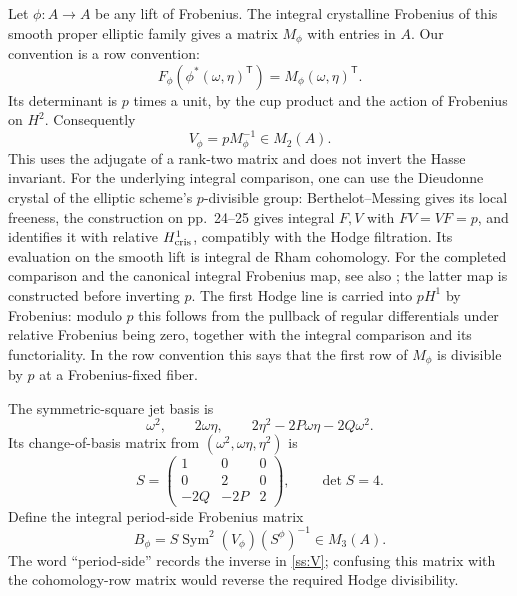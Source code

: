 \documentclass[11pt,a4paper]{article}
\begin{document}
Let $\phi:A\to A$ be any lift of Frobenius.  The integral crystalline
Frobenius of this smooth proper elliptic family gives a matrix $M_\phi$
with entries in $A$.  Our convention is a row convention:
\[
 F_\phi(\phi^*(\omega,\eta)^{\mathsf T})
       =M_\phi(\omega,\eta)^{\mathsf T}.
\]
Its determinant is $p$ times a unit, by the cup product and the action
of Frobenius on $H^2$.  Consequently
\begin{equation}\label{ss:V}
 V_\phi=pM_\phi^{-1}\in M_2(A).
\end{equation}
This uses the adjugate of a rank-two matrix and does not invert the
Hasse invariant.  For the underlying integral comparison, one can use
the Dieudonne crystal of the elliptic scheme's $p$-divisible group:
Berthelot--Messing \cite[\S2, Theorem~2, p.~23]{BM} gives its local
freeness, the construction on pp.~24--25 gives integral $F,V$ with
$FV=VF=p$, and \cite[\S3, equation~(3.1), p.~27]{BM} identifies it with
relative $H^1_{\rm cris}$, compatibly with the Hodge filtration.
Its evaluation on the smooth lift is integral de Rham cohomology.
For the completed comparison and the canonical integral Frobenius map,
see also \cite[Remark~60.24.14, Tag~07MZ; Theorem~60.26.4,
Tag~07N5]{Stacks}; the latter map is constructed before inverting $p$.
The first Hodge line is carried into $pH^1$ by Frobenius: modulo $p$
this follows from the pullback of regular differentials under relative
Frobenius being zero, together with the integral comparison and its
functoriality.  In the row convention this says that the first row
of $M_\phi$ is divisible by $p$ at a Frobenius-fixed fiber.

The symmetric-square jet basis is
\[
 \omega^2,\qquad2\omega\eta,\qquad
 2\eta^2-2P\omega\eta-2Q\omega^2.
\]
Its change-of-basis matrix from $(\omega^2,\omega\eta,\eta^2)$ is
\begin{equation}\label{ss:S}
 S=\begin{pmatrix}1&0&0\\0&2&0\\-2Q&-2P&2\end{pmatrix},
 \qquad\det S=4.
\end{equation}
Define the integral period-side Frobenius matrix
\begin{equation}\label{ss:Bphi}
 B_\phi=S\operatorname{Sym}^2(V_\phi)(S^\phi)^{-1}\in M_3(A).
\end{equation}
The word ``period-side'' records the inverse in \eqref{ss:V}; confusing
this matrix with the cohomology-row matrix would reverse the required
Hodge divisibility.
\end{document}
